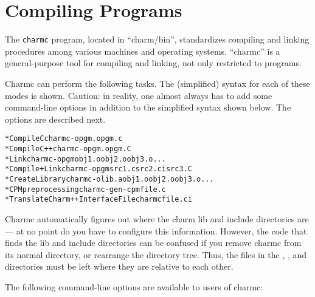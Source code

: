 \section{Compiling \charmpp{} Programs}

The {\tt charmc} program, located in ``charm/bin'', standardizes 
compiling and linking procedures
among various machines and operating systems.  ``charmc'' is
a general-purpose tool for compiling and
linking, not only restricted to \charmpp{} programs.

Charmc can perform the following tasks.  The (simplified) syntax for
each of these modes is shown.  Caution: in reality, one almost always
has to add some command-line options in addition to the simplified
syntax shown below.  The options are described next.

\begin{alltt}
 * Compile C                        charmc -o pgm.o pgm.c
 * Compile C++                      charmc -o pgm.o pgm.C
 * Link                             charmc -o pgm   obj1.o obj2.o obj3.o...
 * Compile + Link                   charmc -o pgm   src1.c src2.ci src3.C
 * Create Library                   charmc -o lib.a obj1.o obj2.o obj3.o...
 * CPM preprocessing                charmc -gen-cpm file.c
 * Translate Charm++ Interface File charmc file.ci
\end{alltt}

Charmc automatically figures out where the charm lib and include
directories are --- at no point do you have to configure this
information.  However, the code that finds the lib and include
directories can be confused if you remove charmc from its normal
directory, or rearrange the directory tree.  Thus, the files in the
, , and  directories 
must be left where they are relative to each other.  

The following command-line options are available to users of charmc:

